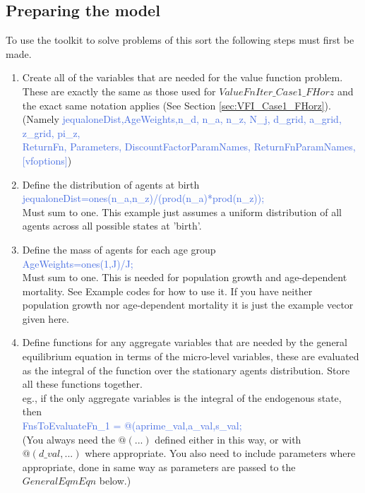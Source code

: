 \subsection{Preparing the model}
To use the toolkit to solve problems of this sort the following steps must first be made.
\begin{enumerate}
 \item Create all of the variables that are needed for the value function problem. These are exactly the same as those used for
   $ValueFnIter\_{}Case1\_{}FHorz$ and the exact same notation applies (See Section \ref{sec:VFI_Case1_FHorz}). \\
    (Namely \textcolor{RoyalBlue}{jequaloneDist,AgeWeights,n\_{}d, n\_{}a, n\_{}z, N\_{}j, d\_{}grid, a\_{}grid, z\_{}grid, pi\_{}z,} \\
    \indent \textcolor{RoyalBlue}{ReturnFn, Parameters, DiscountFactorParamNames, ReturnFnParamNames, [vfoptions]})
 \item Define the distribution of agents at birth \\
   \textcolor{RoyalBlue}{jequaloneDist=ones(n\_{}a,n\_{}z)/(prod(n\_{}a)*prod(n\_{}z));}
   \\ Must sum to one. This example just assumes a uniform distribution of all agents across all possible states at 'birth'.
 \item Define the mass of agents for each age group \\
   \textcolor{RoyalBlue}{AgeWeights=ones(1,J)/J;}
   \\ Must sum to one. This is needed for population growth and age-dependent mortality. See Example codes for how to use it. If you have neither population growth
   nor age-dependent mortality it is just the example vector given here.
 \item Define functions for any aggregate variables that are needed by the general equilibrium equation in terms of the micro-level variables, these
   are evaluated as the integral of the function over the stationary agents distribution. Store all these functions together. \\
   eg., if the only aggregate variables is the integral of the endogenous state, then \\
   \textcolor{RoyalBlue}{FnsToEvaluateFn\_{}1 = @(aprime\_{}val,a\_{}val,s\_{}val;} \\
   (You always need the $@(...)$ defined either in this way, or with $@(d\_{}val,...)$ where appropriate. You also need to include parameters where appropriate, done in same way
   as parameters are passed to the $GeneralEqmEqn$ below.) \\

\end{enumerate}
